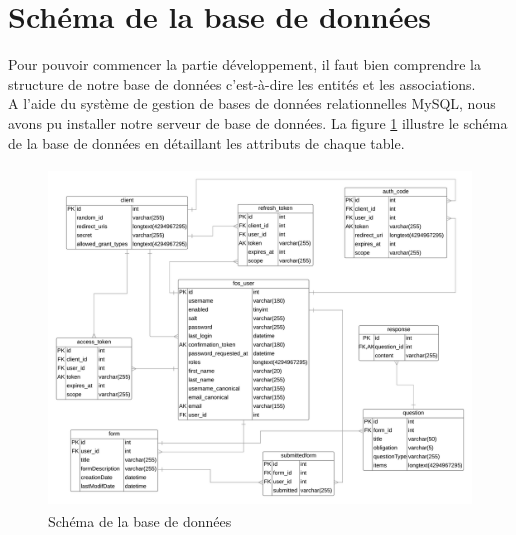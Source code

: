 \section{Schéma de la base de données}
Pour pouvoir commencer la partie développement, il faut bien comprendre la structure de notre base de données c’est-à-dire les entités et les associations.\\
A l'aide du système de gestion de bases de données relationnelles MySQL, nous avons pu installer notre serveur de base de données. La figure \ref{schémaDB} illustre le schéma de la base de données en détaillant les attributs de chaque table.
 \begin{figure} [H]
    \centering
         \begin{center}
             \includegraphics [width=16cm,height=9cm] {SprintImage/DB_schema}
            \caption{Schéma de la base de données}
            \label{schémaDB}
        \end{center}
    \end{figure}
